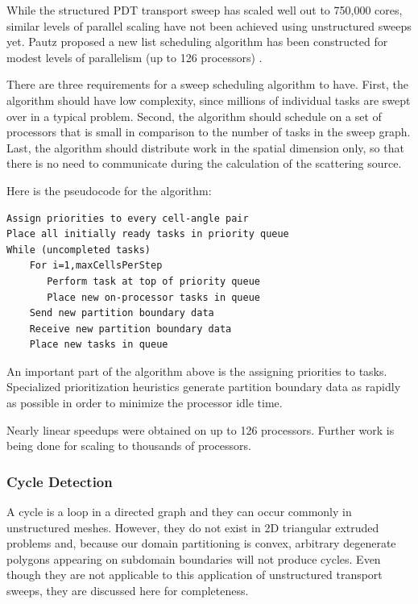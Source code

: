 \documentclass{anstrans}
\begin{document}
While the structured PDT transport sweep has scaled well out to 750,000 cores, similar levels of parallel scaling have not been achieved using unstructured sweeps yet. Pautz proposed a new list scheduling algorithm has been constructed for modest levels of parallelism (up to 126 processors)\cite{Pautz} .

There are three requirements for a sweep scheduling algorithm to have. First, the algorithm should have low complexity, since millions of individual tasks are swept over in a typical problem. Second, the algorithm should schedule on a set of processors that is small in comparison to the number of tasks in the sweep graph. Last, the algorithm should distribute work in the spatial dimension only, so that there is no need to communicate during the calculation of the scattering source. 

Here is the pseudocode\cite{Pautz} for the algorithm:

\begin{verbatim}
Assign priorities to every cell-angle pair
Place all initially ready tasks in priority queue
While (uncompleted tasks)
    For i=1,maxCellsPerStep
       Perform task at top of priority queue
       Place new on-processor tasks in queue
    Send new partition boundary data
    Receive new partition boundary data
    Place new tasks in queue 
\end{verbatim}

An important part of the algorithm above is the assigning priorities to tasks. Specialized prioritization heuristics generate partition boundary data as rapidly as possible in order to minimize the processor idle time. 

Nearly linear speedups were obtained on up to 126 processors\cite{Pautz}. Further work is being done for scaling to thousands of processors. 

\subsubsection{Cycle Detection}

A cycle is a loop in a directed graph and they can occur commonly in unstructured meshes. However, they do not exist in 2D triangular extruded problems and, because our domain partitioning is convex, arbitrary degenerate polygons appearing on subdomain boundaries will not produce cycles. Even though they are not applicable to this application of unstructured transport sweeps, they are discussed here for completeness.
\end{document}
